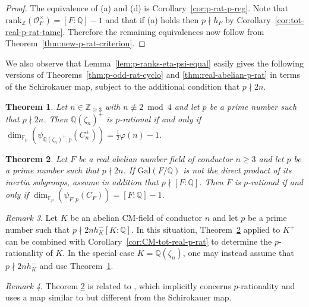 \documentclass[12pt, a4paper, usenames]{amsart}
\newcommand{\Z}{\mathbb{Z}}
\newcommand{\Q}{\mathbb{Q}}
\newcommand{\F}{\mathbb{F}}
\theoremstyle{plain}
\newtheorem{theorem}{Theorem}[section]
\theoremstyle{remark}
\newtheorem{remark}[theorem]{Remark}
\theoremstyle{definition}
\newcommand{\Gal}{\mathrm{Gal}}
\newcommand{\rank}{\mathrm{rank}}
\begin{document}
\begin{proof}
The equivalence of (a) and (d) is Corollary~\ref{cor:p-rat-p-reg}.
Note that $\rank_{\Z}(\mathcal{O}_{F}^{\times}) = [F:\Q]-1$
and that if (a) holds then $p \nmid h_{F}$ by 
Corollary~\ref{cor:tot-real-p-rat-tame}. 
Therefore the remaining equivalences now follow from 
Theorem~\ref{thm:new-p-rat-criterion}.
\end{proof}

We also observe that Lemma~\ref{lem:p-ranks-eta-psi-equal} easily gives the 
following versions of Theorems~\ref{thm:p-odd-rat-cyclo} and \ref{thm:real-abelian-p-rat} in terms of the Schirokauer map, subject to the additional condition that $p \nmid 2n$.

\begin{theorem}\label{thm:p-rat-cyclo-Schirokauer} 
Let $n \in \Z_{\geq 3}$ with $n \not \equiv 2 \bmod 4$
and let $p$ be a prime number such that $p \nmid 2n$.
Then $\Q(\zeta_{n})^{+}$ is $p$-rational if and only if
$\dim_{\mathbb{F}_{p}}(\psi_{\Q(\zeta_{n})^{+},p}(C_{n}^{+}))=\frac{1}{2}\varphi(n) - 1$.
\end{theorem}

\begin{theorem}\label{thm:real-abelian-p-rat-Schirokauer} 
Let $F$ be a real abelian number field of conductor $n \geq 3$
and let $p$ be a prime number such that $p \nmid 2n$.
If $\Gal(F/\Q)$ is not the direct product of its inertia subgroups,
assume in addition that $p \nmid [F:\Q]$.
Then $F$ is $p$-rational if and only if 
$\dim_{\F_{p}}(\psi_{F,p}(C_{F}))=[F:\Q]-1$.
\end{theorem}

\begin{remark}
Let $K$ be an abelian CM-field of conductor $n$ and let $p$ be a prime number
such that $p \nmid 2nh_{K}^{-}[K:\Q]$. 
In this situation, Theorem~\ref{thm:real-abelian-p-rat-Schirokauer} applied
to $K^{+}$ can be combined with Corollary~\ref{cor:CM-tot-real-p-rat} to determine the 
$p$-rationality of $K$. In the special case $K=\Q(\zeta_{n})$, one may instead
assume that $p \nmid 2nh_{K}^{-}$ and use Theorem~\ref{thm:p-rat-cyclo-Schirokauer}.
\end{remark}

\begin{remark}
Theorem \ref{thm:real-abelian-p-rat-Schirokauer} is related to
\cite[Theorem 3]{MR5078208}, which implicitly concerns $p$-rationality
and uses a map similar to but different from the Schirokauer map.
\end{remark}
\end{document}
